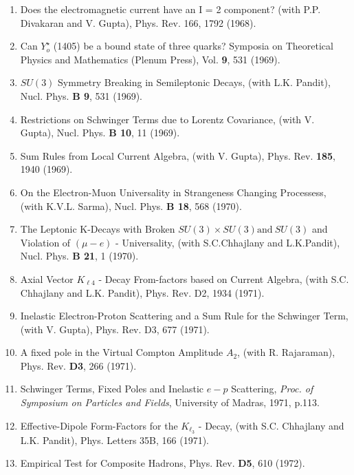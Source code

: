 \begin{enumerate}
\item Does the electromagnetic current have an I = 2 component? (with
P.P. Divakaran and V. Gupta), Phys. Rev. 166, 1792 (1968).

\item Can $Y^\star_o$ (1405) be a bound state of three quarks? Symposia
on Theoretical Physics and Mathematics (Plenum Press), Vol. {\bf 9}, 531
(1969).

\item $SU(3)$ Symmetry Breaking in Semileptonic Decays, (with L.K.
Pandit), Nucl. Phys. {\bf B 9}, 531 (1969).

\item Restrictions on Schwinger Terms due to Lorentz Covariance, (with
V. Gupta), Nucl. Phys. {\bf B 10}, 11 (1969).

\item Sum Rules from Local Current Algebra, (with V. Gupta), Phys. Rev.
{\bf 185}, 1940 (1969).

\item On the Electron-Muon Universality in Strangeness Changing
Processess, (with K.V.L. Sarma), Nucl. Phys. {\bf B 18}, 568 (1970).

\item The Leptonic K-Decays with Broken $SU(3) \times SU(3) \mbox{and}
\ SU(3)$ and Violation of $(\mu - e)$ - Universality, (with S.C.Chhajlany
and L.K.Pandit), Nucl. Phys. {\bf B 21}, 1 (1970).

\item Axial Vector $K_{\ell 4}$ - Decay From-factors based on Current
Algebra, (with S.C. Chhajlany and L.K. Pandit), Phys. Rev. D2, 1934
(1971).

\item Inelastic Electron-Proton Scattering and a Sum Rule for the
Schwinger Term, (with V. Gupta), Phys. Rev. D3, 677 (1971).

\item A fixed pole in the Virtual Compton Amplitude $A_2$, (with R.
Rajaraman), Phys. Rev. {\bf D3}, 266 (1971).

\item Schwinger Terms, Fixed Poles and Inelastic $e-p$ Scattering, {\it Proc.
of Symposium on Particles and Fields}, University of Madras, 1971, p.113.

\item Effective-Dipole Form-Factors for the $K_{\ell_3}$ - Decay, (with
S.C. Chhajlany and L.K. Pandit), Phys. Letters 35B, 166 (1971).

\item Empirical Test for Composite Hadrons, Phys. Rev. {\bf D5}, 610
(1972).


\end{enumerate}
